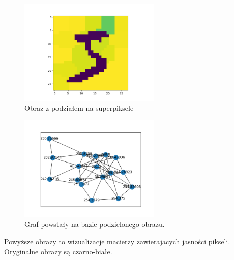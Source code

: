 \documentclass{article}
\begin{document}
\begin{figure}[H]
    \centering
    \includegraphics[width=0.6\textwidth]{img/5Sliced.png}
    \caption{Obraz z podziałem na superpiksele} 
\end{figure}

\begin{figure}[H]
    \centering
    \includegraphics[width=0.6\textwidth]{img/5Graph.png}
    \caption{Graf powstały na bazie podzielonego obrazu.} 
\end{figure}

Powyższe obrazy to wizualizacje macierzy zawierajacych jasności pikseli. 
Oryginalne obrazy są czarno-białe. 
\end{document}
